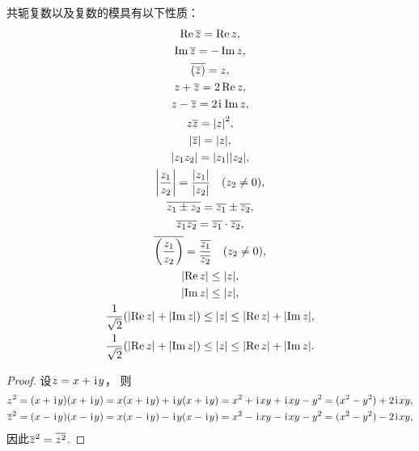\begin{property}
共轭复数以及复数的模具有以下性质：\begin{gather}
	\Re \overline{z} = \Re z, \\
	\Im \overline{z} = -\Im z, \\
	\overline{(\overline{z})} = z, \\
	z+\overline{z} = 2 \Re z, \\
	z-\overline{z} = 2\kern1pt\mathrm{i}\kern1pt \Im z, \\
	z\overline{z} = \abs{z}^2, \\
	\abs{\overline{z}}=\abs{z}, \\
	\abs{z_1 z_2} = \abs{z_1} \abs{z_2}, \\
	\abs{\frac{z_1}{z_2}} = \frac{\abs{z_1}}{\abs{z_2}} \quad(z_2 \neq 0), \\
	\overline{z_1 \pm z_2} = \overline{z_1} \pm \overline{z_2}, \\
	\overline{z_1 z_2} = \overline{z_1} \cdot \overline{z_2}, \\
	\overline{\left(\frac{z_1}{z_2}\right)} = \frac{\overline{z_1}}{\overline{z_2}} \quad (z_2 \neq 0), \\
	\abs{\Re z} \leq \abs{z}, \\
	\abs{\Im z} \leq \abs{z}, \\
	\frac1{\sqrt2} (\abs{\Re z} + \abs{\Im z})
	\leq \abs{z}
	\leq \abs{\Re z} + \abs{\Im z}, \\
	\frac1{\sqrt2} (\abs{\Re z} + \abs{\Im z})
	\leq \abs{z}
	\leq \abs{\Re z} + \abs{\Im z}.
\end{gather}
\begin{proof}
设\(z = x + \kern1pt\mathrm{i}\kern1pt y\)，
则\begin{align*}
	z^2
	&= (x + \kern1pt\mathrm{i}\kern1pt y) (x + \kern1pt\mathrm{i}\kern1pt y)
	= x (x + \kern1pt\mathrm{i}\kern1pt y) + \kern1pt\mathrm{i}\kern1pt y (x + \kern1pt\mathrm{i}\kern1pt y)
	= x^2 + \kern1pt\mathrm{i}\kern1pt x y + \kern1pt\mathrm{i}\kern1pt x y - y^2
	= (x^2 - y^2) + 2 \kern1pt\mathrm{i}\kern1pt x y, \\
	\overline{z}^2
	&= (x - \kern1pt\mathrm{i}\kern1pt y) (x - \kern1pt\mathrm{i}\kern1pt y)
	= x (x - \kern1pt\mathrm{i}\kern1pt y) - \kern1pt\mathrm{i}\kern1pt y (x - \kern1pt\mathrm{i}\kern1pt y)
	= x^2 - \kern1pt\mathrm{i}\kern1pt x y - \kern1pt\mathrm{i}\kern1pt x y - y^2
	= (x^2 - y^2) - 2 \kern1pt\mathrm{i}\kern1pt x y,
\end{align*}
因此\(\overline{z}^2 = \overline{z^2}\).
\end{proof}
\end{property}

